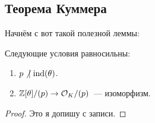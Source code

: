 	\subsection{Теорема Куммера}

	Начнём с вот такой полезной леммы:

	\begin{lemma}\label{ind_and_p}
		Следующие условия равносильны:
		\begin{enumerate}
			\item $p \not\ \mid \operatorname{ind}(\theta)$.
			\item $\mathbb{Z}[\theta]/(p) \to \mathcal{O}_{K}/(p)$~--- изоморфизм.
		\end{enumerate}
	\end{lemma}

	\begin{proof}
		Это я допишу с записи. 
	\end{proof}

